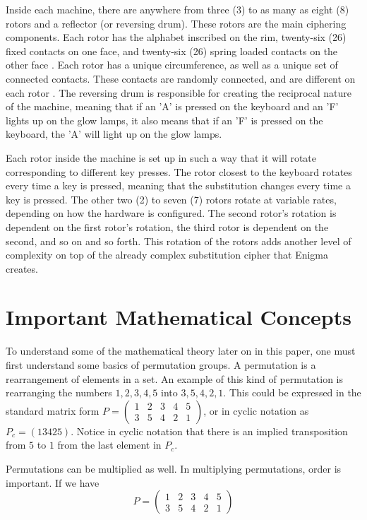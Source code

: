 Inside each machine, there are anywhere from three (3) to as many as eight (8) rotors and a reflector (or reversing drum). These rotors are the main ciphering components. Each rotor has the alphabet inscribed on the rim, twenty-six (26) fixed contacts on one face, and twenty-six (26) spring loaded contacts on the other face \cite{wk85}. Each rotor has a unique circumference, as well as a unique set of connected contacts. These contacts are randomly connected, and are different on each rotor \cite{bw05}. The reversing drum is responsible for creating the reciprocal nature of the machine, meaning that if an 'A' is pressed on the keyboard and an 'F' lights up on the glow lamps, it also means that if an 'F' is pressed on the keyboard, the 'A' will light up on the glow lamps.

Each rotor inside the machine is set up in such a way that it will rotate corresponding to different key presses. The rotor closest to the keyboard rotates every time a key is pressed, meaning that the substitution changes every time a key is pressed. The other two (2) to seven (7) rotors rotate at variable rates, depending on how the hardware is configured. The second rotor's rotation is dependent on the first rotor's rotation, the third rotor is dependent on the second, and so on and so forth. This rotation of the rotors adds another level of complexity on top of the already complex substitution cipher that Enigma creates.

\section{Important Mathematical Concepts}\label{sec:mathconcepts}

To understand some of the mathematical theory later on in this paper, one must first understand some basics of permutation groups. A permutation is a rearrangement of elements in a set. An example of this kind of permutation is rearranging the numbers ${1,2,3,4,5}$ into ${3,5,4,2,1}$. This could be expressed in the standard matrix form
$P = \begin{pmatrix}
    1 & 2 & 3 & 4 & 5 \\
    3 & 5 & 4 & 2 & 1
  \end{pmatrix}$, or in cyclic notation as $P_c = (1 3 4 2 5)$. Notice in cyclic notation that there is an implied transposition from $5$ to $1$ from the last element in $P_c$.

Permutations can be multiplied as well. In multiplying permutations, order is important. If we have
$$P = \begin{pmatrix}
    1 & 2 & 3 & 4 & 5 \\
    3 & 5 & 4 & 2 & 1
  \end{pmatrix}$$

